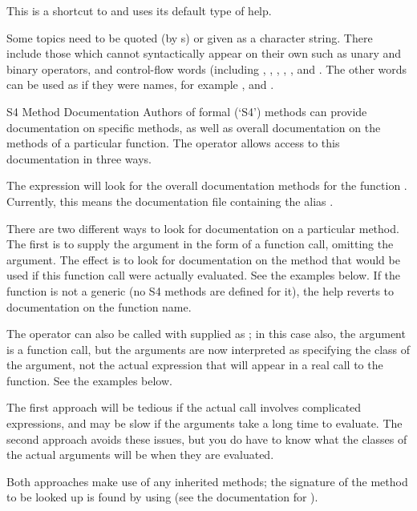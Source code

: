 %
\begin{Details}\relax
This is a shortcut to  and uses its default type of help.

Some topics need to be quoted (by s) or given as a
character string.  There include those which cannot syntactically
appear on their own such as unary and binary operators,
 and control-flow  words (including
,  , , ,
,  and .  The other 
words can be used as if they were names, for example ,
 and .
\end{Details}
%
\begin{Section}{S4 Method Documentation}
Authors of formal (`S4') methods can provide documentation
on specific methods, as well as overall documentation on the methods
of a particular function.  The  operator allows access to
this documentation in three ways.

The expression  will look for the overall
documentation methods for the function .  Currently,
this means the documentation file containing the alias
.

There are two different ways to look for documentation on a
particular method.  The first is to supply the  argument
in the form of a function call, omitting the  argument.
The effect is to look for documentation on the method that would be
used if this function call were actually evaluated. See the examples
below.  If the function is not a generic (no S4 methods are defined
for it), the help reverts to documentation on the function name.

The  operator can also be called with  supplied
as ; in this case also, the  argument is
a function call, but the arguments are now interpreted as specifying
the class of the argument, not the actual expression that will
appear in a real call to the function.  See the examples below.

The first approach will be tedious if the actual call involves
complicated expressions, and may be slow if the arguments take a
long time to evaluate.  The second approach avoids these
issues, but you do have to know what the classes of the actual
arguments will be when they are evaluated.

Both approaches make use of any inherited methods; the signature of
the method to be looked up is found by using 
(see the documentation for ).
\end{Section}
